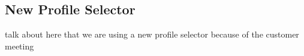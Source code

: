 \subsection{New Profile Selector}

talk about here that we are using a new profile selector because of the customer meeting